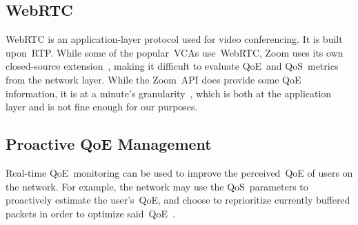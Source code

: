     \subsection{WebRTC}\label{introduction:webrtc}
        WebRTC is an application-layer protocol used for video conferencing. It is built upon~RTP. While some of the popular~VCAs use~WebRTC, Zoom uses its own closed-source extension~\autocite{marczak2020}, making it difficult to evaluate QoE~and QoS~metrics from the network layer. While the Zoom~API does provide some QoE information, it is at a minute's granularity~\autocite{walia2019}, which is both at the application layer and is not fine enough for our purposes.

    \subsection{Proactive QoE Management}\label{introduction:applications:management}
        Real-time QoE~monitoring can be used to improve the perceived~QoE of users on the network. For example, the network may use the QoS~parameters to proactively estimate the user's~QoE, and choose to reprioritize currently buffered packets in order to optimize said~QoE~\autocite{DinakiHosseinEbrahimi2021FVQW}.

